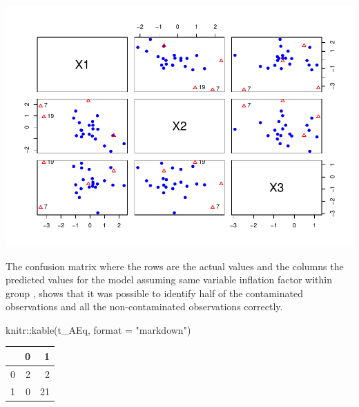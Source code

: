 \documentclass[
]{article}
\newenvironment{Shaded}{\begin{snugshade}}{\end{snugshade}}
\newcommand{\AttributeTok}[1]{\textcolor[rgb]{0.77,0.63,0.00}{#1}}
\newcommand{\DecValTok}[1]{\textcolor[rgb]{0.00,0.00,0.81}{#1}}
\newcommand{\FunctionTok}[1]{\textcolor[rgb]{0.00,0.00,0.00}{#1}}
\newcommand{\NormalTok}[1]{#1}
\newcommand{\SpecialCharTok}[1]{\textcolor[rgb]{0.00,0.00,0.00}{#1}}
\newcommand{\StringTok}[1]{\textcolor[rgb]{0.31,0.60,0.02}{#1}}
\begin{document}
\begin{Shaded}
\end{Shaded}

\includegraphics{DifferentVarInflationFactors_files/figure-latex/plotA_test-1.pdf}

The confusion matrix where the rows are the actual values and the
columns the predicted values for the model assuming same variable
inflation factor within group , shows that it was possible to identify
half of the contaminated observations and all the non-contaminated
observations correctly.

\begin{Shaded}
\begin{Highlighting}[]
\NormalTok{knitr}\SpecialCharTok{::}\FunctionTok{kable}\NormalTok{(t\_AEq, }\AttributeTok{format =} \StringTok{"markdown"}\NormalTok{)}
\end{Highlighting}
\end{Shaded}

\begin{longtable}[]{@{}lrr@{}}
\toprule()
& 0 & 1 \\
\midrule()
\endhead
0 & 2 & 2 \\
1 & 0 & 21 \\
\bottomrule()
\end{longtable}
\end{document}
